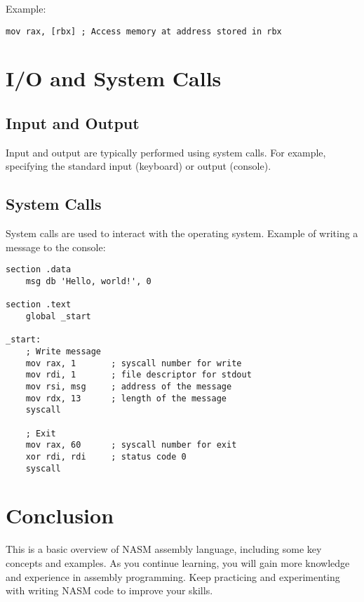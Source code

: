\documentclass{article}
\begin{document}
Example:
\begin{lstlisting}
mov rax, [rbx] ; Access memory at address stored in rbx
\end{lstlisting}

\section{I/O and System Calls}

\subsection{Input and Output}
Input and output are typically performed using system calls. For example, specifying the standard input (keyboard) or output (console).

\subsection{System Calls}
System calls are used to interact with the operating system. Example of writing a message to the console:

\begin{lstlisting}
section .data
    msg db 'Hello, world!', 0

section .text
    global _start

_start:
    ; Write message
    mov rax, 1       ; syscall number for write
    mov rdi, 1       ; file descriptor for stdout
    mov rsi, msg     ; address of the message
    mov rdx, 13      ; length of the message
    syscall

    ; Exit
    mov rax, 60      ; syscall number for exit
    xor rdi, rdi     ; status code 0
    syscall
\end{lstlisting}

\section{Conclusion}
This is a basic overview of NASM assembly language, including some key concepts and examples. As you continue learning, you will gain more knowledge and experience in assembly programming. Keep practicing and experimenting with writing NASM code to improve your skills.
\end{document}
